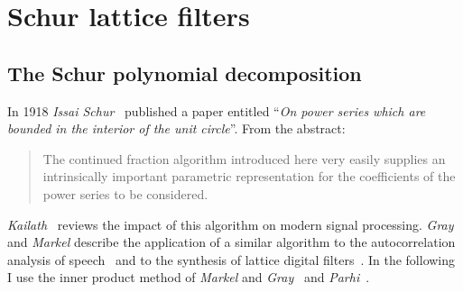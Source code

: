 \documentclass[a4paper,twoside,10pt,english]{article}
\begin{document}
\section{Schur lattice filters}
\subsection{The Schur polynomial decomposition}
In 1918 \emph{Issai Schur}~\cite{SchurMethodsInOperatorTheory_Schur_I}
published a paper entitled ``\emph{On power series which are bounded in the
  interior of the unit circle}''. From the abstract:
\begin{quotation}
  The continued fraction algorithm introduced here very easily supplies an
  intrinsically important parametric representation for the coefficients of the
  power series to be considered.
\end{quotation}
\emph{Kailath}~\cite{SchurMethodsInOperatorTheory_Kailath} reviews the impact of
this algorithm on modern signal processing. \emph{Gray} and \emph{Markel}
describe the application of a similar algorithm to the autocorrelation analysis
of speech~\cite{MarkelGray_AutocorrelationSpeechAnalysis} and to the synthesis
of lattice digital
filters~\cite{GrayMarkel_DigitalLatticeAndLadderFilterSynthesis}. 
In the following I use the inner product method of \emph{Markel} and
\emph{Gray}~\cite{MarkelGray_AutocorrelationSpeechAnalysis} and
\emph{Parhi}~\cite[Chapter 12 and Appendix
D]{Parhi_VLSIDigitalSignalProcessingSystems}.
\end{document}
